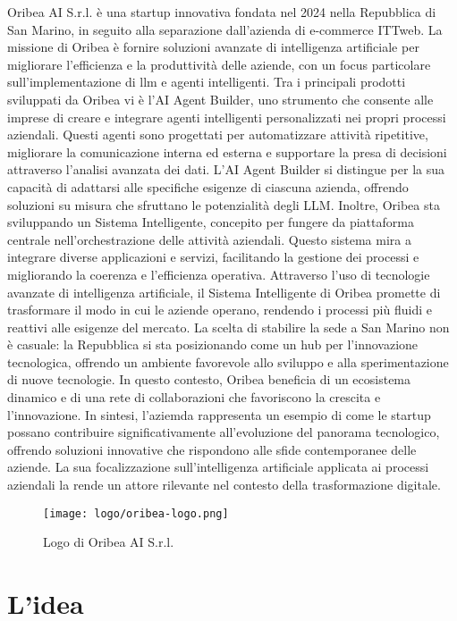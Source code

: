 Oribea AI S.r.l. è una startup innovativa fondata nel 2024 nella Repubblica di San Marino, in seguito alla separazione dall'azienda di e-commerce ITTweb. La missione di Oribea è fornire soluzioni avanzate di intelligenza artificiale per migliorare l'efficienza e la produttività delle aziende, con un focus particolare sull'implementazione di \gls{llm} e agenti intelligenti.
Tra i principali prodotti sviluppati da Oribea vi è l'AI Agent Builder, uno strumento che consente alle imprese di creare e integrare agenti intelligenti personalizzati nei propri processi aziendali. Questi agenti sono progettati per automatizzare attività ripetitive, migliorare la comunicazione interna ed esterna e supportare la presa di decisioni attraverso l'analisi avanzata dei dati. L'AI Agent Builder si distingue per la sua capacità di adattarsi alle specifiche esigenze di ciascuna azienda, offrendo soluzioni su misura che sfruttano le potenzialità degli LLM.
Inoltre, Oribea sta sviluppando un Sistema Intelligente, concepito per fungere da piattaforma centrale nell'orchestrazione delle attività aziendali. Questo sistema mira a integrare diverse applicazioni e servizi, facilitando la gestione dei processi e migliorando la coerenza e l'efficienza operativa. Attraverso l'uso di tecnologie avanzate di intelligenza artificiale, il Sistema Intelligente di Oribea promette di trasformare il modo in cui le aziende operano, rendendo i processi più fluidi e reattivi alle esigenze del mercato.
La scelta di stabilire la sede a San Marino non è casuale: la Repubblica si sta posizionando come un hub per l'innovazione tecnologica, offrendo un ambiente favorevole allo sviluppo e alla sperimentazione di nuove tecnologie. In questo contesto, Oribea beneficia di un ecosistema dinamico e di una rete di collaborazioni che favoriscono la crescita e l'innovazione.
In sintesi, l'aziemda rappresenta un esempio di come le startup possano contribuire significativamente all'evoluzione del panorama tecnologico, offrendo soluzioni innovative che rispondono alle sfide contemporanee delle aziende. La sua focalizzazione sull'intelligenza artificiale applicata ai processi aziendali la rende un attore rilevante nel contesto della trasformazione digitale.

\begin{figure}
    \centering
    \texttt{[image: logo/oribea-logo.png]}
    \caption{Logo di Oribea AI S.r.l.}
    \label{fig:oribea-logo}
\end{figure}

\section{L'idea}

